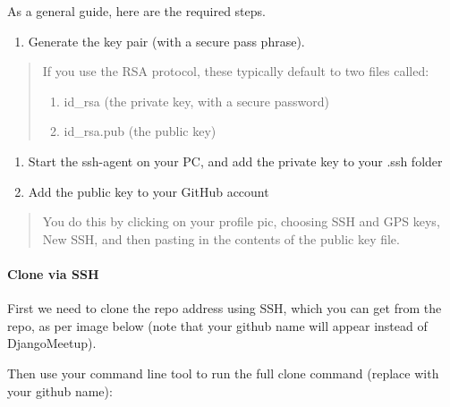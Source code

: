\documentclass[letterpaper,10pt,english]{sphinxmanual}
\begin{document}
As a general guide, here are the required steps.
\begin{enumerate}
\def\theenumi{\roman{enumi}}
\def\labelenumi{(\theenumi )}
\makeatletter\def\p@enumii{\p@enumi (\theenumi )}\makeatother
\item {} 
Generate the key pair (with a secure pass phrase).

\end{enumerate}
\begin{quote}

If you use the RSA protocol, these typically default to two files called:
\begin{enumerate}
\def\theenumi{\alph{enumi}}
\def\labelenumi{\theenumi .}
\makeatletter\def\p@enumii{\p@enumi \theenumi .}\makeatother
\item {} 
id\_rsa          (the private key, with a secure password)

\item {} 
id\_rsa.pub              (the public key)

\end{enumerate}
\end{quote}
\begin{enumerate}
\def\theenumi{\roman{enumi}}
\def\labelenumi{(\theenumi )}
\makeatletter\def\p@enumii{\p@enumi (\theenumi )}\makeatother
\setcounter{enumi}{1}
\item {} 
Start the ssh-agent on your PC, and add the private key to your .ssh folder

\item {} 
Add the public key to your GitHub account

\end{enumerate}
\begin{quote}

You do this by clicking on your profile pic, choosing SSH and GPS keys, New SSH, and then pasting in the contents of the public key file.
\end{quote}


\paragraph{Clone via SSH}
\label{\detokenize{guide/02_download-project:clone-via-ssh}}
First we need to clone the repo address using SSH, which you can get from the repo, as per image below (note that your github name will appear instead of DjangoMeetup).

Then use your command line tool to run the full clone command (replace  with your github name):
\end{document}
